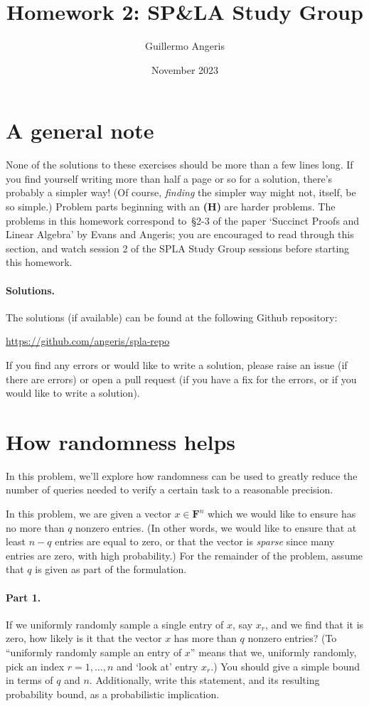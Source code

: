 \documentclass[12pt]{article}
\title{Homework 2: SP\&LA Study Group}
\author{Guillermo Angeris}
\date{November 2023}
\newcommand{\field}{\mathbf{F}}
\begin{document}
 
\maketitle 

\section*{A general note}
None of the solutions to these exercises should be more than a few lines long.
If you find yourself writing more than half a page or so for a solution,
there's probably a simpler way! (Of course, \emph{finding} the simpler way
might not, itself, be so simple.) Problem parts beginning with an {\bf (H)} are
harder problems. The problems in this homework correspond to~\S2-3 of the paper
`Succinct Proofs and Linear Algebra' by Evans and Angeris; you are encouraged
to read through this section, and watch session 2 of the SPLA Study Group
sessions before starting this homework.

\paragraph{Solutions.} The solutions (if available) can be found at the
following Github repository:
\begin{center}
    \url{https://github.com/angeris/spla-repo}
\end{center}
If you find any errors or would like to write a solution, please raise an issue
(if there are errors) or open a pull request (if you have a fix for the errors,
or if you would like to write a solution).

\section{How randomness helps}
In this problem, we'll explore how randomness can be used to greatly reduce
the number of queries needed to verify a certain task to a reasonable
precision.

In this problem, we are given a vector $x \in \field^n$ which we would like to
ensure has no more than $q$ nonzero entries. (In other words, we would like to
ensure that at least $n-q$ entries are equal to zero, or that the vector is
\emph{sparse} since many entries are zero, with high probability.) For the
remainder of the problem, assume that $q$ is given as part of the formulation.

\paragraph{Part 1.} If we uniformly randomly sample a single entry of $x$, say
$x_r$, and we find that it is zero, how likely is it that the vector $x$ has
more than $q$ nonzero entries? (To ``uniformly randomly sample an entry of
$x$'' means that we, uniformly randomly, pick an index $r=1, \dots, n$ and
`look at' entry $x_r$.) You should give a simple bound in terms of $q$ and $n$.
Additionally, write this statement, and its resulting probability bound, as a
probabilistic implication.
\end{document}
